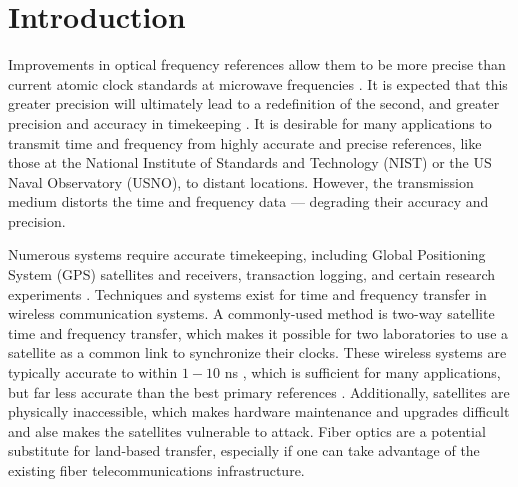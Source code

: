 \chapter{Introduction}

Improvements in optical frequency references allow them to be more precise than current atomic clock standards at microwave frequencies \cite{ProgressOpticalClock, RedefinitionOfSecond, Diddams2004}. It is expected that this greater precision will ultimately lead to a redefinition of the second, and greater precision and accuracy in timekeeping \cite{RedefinitionOfSecond}. It is desirable for many applications to transmit time and frequency from highly accurate and precise references, like those at the National Institute of Standards and Technology (NIST) or the US Naval Observatory (USNO), to distant locations. However, the transmission medium distorts the time and frequency data --- degrading their accuracy and precision.




Numerous systems require accurate timekeeping, including Global Positioning System (GPS) satellites and receivers, transaction logging, and certain research experiments \cite{ScienceOfTimekeeping}. Techniques and systems exist for time and frequency transfer in wireless communication systems.  A commonly-used method is two-way satellite time and frequency transfer, which makes it possible for two laboratories to use a satellite as a common link to synchronize their clocks. These wireless systems are typically accurate to within $1-10$ ns \cite{Allan1980}, which is sufficient for many applications, but far less accurate than the best primary references \cite{NISTFreqStandards, Audoin1976}. Additionally, satellites are physically inaccessible, which makes hardware maintenance and upgrades difficult and alse makes the satellites vulnerable to attack. Fiber optics are a potential substitute for land-based transfer, especially if one can take advantage of the existing fiber telecommunications infrastructure.


